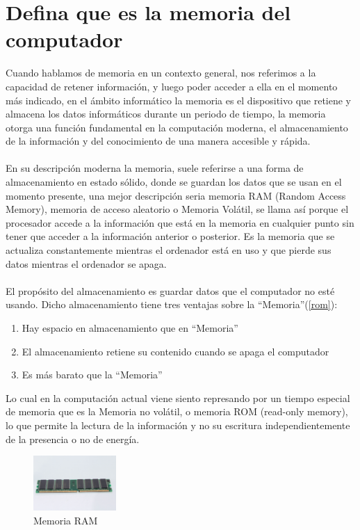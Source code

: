 \documentclass{article}
\begin{document}
	\newpage
	
	\section{Defina que es la memoria del computador} \label{defina}
	Cuando hablamos de memoria en un contexto general, nos referimos a la capacidad de retener información, y luego poder acceder a ella en el momento más indicado, en el ámbito informático la memoria es el dispositivo que retiene y almacena los datos informáticos durante un periodo de tiempo, la memoria otorga una función fundamental en la computación moderna, el almacenamiento de la información y del conocimiento de una manera accesible y rápida.\cite{memoria}
	\\\\
	En su descripción moderna la memoria, suele referirse a una forma de almacenamiento en estado sólido, donde se guardan los datos que se usan en el momento presente, una mejor descripción seria memoria RAM (Random Access Memory), memoria de acceso aleatorio o Memoria Volátil\cite{monografia}, se llama así porque el procesador accede a la información que está en la memoria en cualquier punto sin tener que acceder a la información anterior o posterior. Es la memoria que se actualiza constantemente mientras el ordenador está en uso y que pierde sus datos mientras el ordenador se apaga.
	\\\\
	El propósito del almacenamiento es guardar datos que el computador no esté usando. Dicho almacenamiento tiene tres ventajas sobre la “Memoria”(\ref{rom}):
	
	\begin{enumerate}
		
		\item Hay espacio en almacenamiento que en “Memoria”
		\item El almacenamiento retiene su contenido cuando se apaga el computador
		\item Es más barato que la “Memoria”
		
	\end{enumerate}
	
	 Lo cual en la computación actual viene siento represando por un tiempo especial de memoria que es la Memoria no volátil, o memoria ROM (read-only memory), lo que permite la lectura de la información y no su escritura independientemente de la presencia o no de energía.\\
	 
	 \begin{figure}
	 \centering
	 \includegraphics[width=0.28\textwidth]{ram.jpg}
	 \caption{Memoria RAM}
	 \label{ram}
	 \end{figure}
	 
\end{document}
